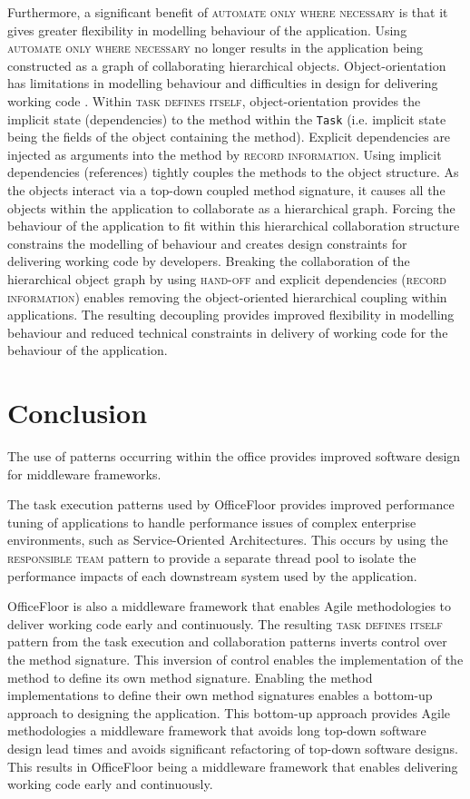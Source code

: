 \documentclass[prodmode]{style/acmlarge}
\begin{document}
Furthermore, a significant benefit of \textsc{automate only where necessary} is
that it gives greater flexibility in modelling behaviour of the application.
Using \textsc{automate only where necessary} no longer results in the
application being constructed as a graph of collaborating hierarchical objects.
Object-orientation has limitations in modelling behaviour
\cite{oo-behaviour,bridging-function-oo} and difficulties in design for
delivering working code \cite{oo-design}.  Within \textsc{task defines itself},
object-orientation provides the implicit state (dependencies) to the method
within the \texttt{Task} (i.e. implicit state being the fields of the object
containing the method).  Explicit dependencies are injected as arguments into
the method by \textsc{record information}.  Using implicit dependencies
(references) tightly couples the methods to the object structure.  As the
objects interact via a top-down coupled method signature, it causes all the
objects within the application to collaborate as a hierarchical graph.  Forcing
the behaviour of the application to fit within this hierarchical collaboration
structure constrains the modelling of behaviour and creates design constraints
for delivering working code by developers.  Breaking the collaboration of the
hierarchical object graph by using \textsc{hand-off} and explicit dependencies
(\textsc{record information}) enables removing the object-oriented hierarchical
coupling within applications.  The resulting decoupling provides improved
flexibility in modelling behaviour and reduced technical constraints in delivery
of working code for the behaviour of the application.



\section{Conclusion}

The use of patterns occurring within the office provides improved software
design for middleware frameworks.

The task execution patterns used by OfficeFloor provides improved performance
tuning of applications to handle performance issues of complex enterprise
environments, such as Service-Oriented Architectures.  This occurs by using the
\textsc{responsible team} pattern to provide a separate thread pool to isolate
the performance impacts of each downstream system used by the application.

OfficeFloor is also a middleware framework that enables Agile methodologies to
deliver working code early and continuously.  The resulting \textsc{task
defines itself} pattern from the task execution and collaboration patterns
inverts control over the method signature.  This inversion of control enables
the implementation of the method to define its own method signature.  Enabling
the method implementations to define their own method signatures enables a
bottom-up approach to designing the application.  This bottom-up approach
provides Agile methodologies a middleware framework that avoids long top-down
software design lead times and avoids significant refactoring of top-down
software designs.  This results in OfficeFloor being a middleware framework that
enables delivering working code early and continuously.
\end{document}
